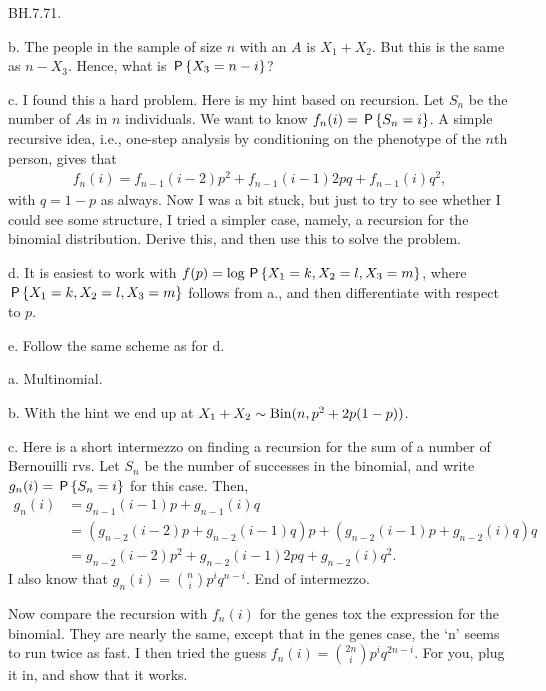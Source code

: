 \begin{exercise}
BH.7.71.

\begin{hint}

b. The people in the sample of size $n$ with an $A$ is $X_1+X_2$. But this is the same as $n-X_3$. Hence, what is $\P{X_3=n-i}$?


c. I found this a hard problem.
Here is my hint based on recursion.
Let $S_n$ be the number of $A$s in $n$ individuals.
We want to know $f_n(i) = \P{S_n=i}$.
A simple recursive idea, i.e., one-step analysis by conditioning on the phenotype of the $n$th person, gives that
\begin{align*}
f_n(i)=f_{n-1}(i-2) p^2 + f_{n-1}(i-1) 2p q + f_{n-1}(i)q^2,
\end{align*}
with $q=1-p$ as always. Now I was a bit stuck, but just to try to see whether I could see some structure, I tried a simpler case, namely, a recursion for the binomial distribution. Derive this, and then use this to solve the problem.


d. It is easiest to work with $f(p) = \log \P{X_1=k, X_2=l, X_3 = m}$, where $\P{X_1=k, X_2=l, X_3 = m}$ follows from a., and then differentiate with respect to $p$.

e. Follow the same scheme as for d.
\end{hint}

\begin{solution}
a. Multinomial.

b. With the hint we end up at $X_1+X_2\sim \Bin{n, p^2+2p(1-p)}$.

c. Here is a short intermezzo on finding a recursion for the sum of a number of Bernouilli rvs.  Let $S_n$ be the number of successes in the binomial, and write $g_n(i) = \P{S_n=i}$ for this case.
Then,
\begin{align*}
g_n(i)&= g_{n-1}(i-1)p +  g_{n-1}(i)q \\
&= (g_{n-2}(i-2)p + g_{n-2}(i-1)q)p + (g_{n-2}(i-1)p+g_{n-2}(i)q)q \\
&= g_{n-2}(i-2)p^2 + g_{n-2}(i-1)2p q + g_{n-2}(i)q^{2}.
\end{align*}
I also know that $g_n(i) = {n \choose i} p^iq^{n-i}$.
End of intermezzo.

Now compare the recursion with $f_n(i)$ for the genes tox the expression for the binomial.
They are nearly the same, except that in the genes case, the `n' seems to run twice as fast.
I then tried the guess $f_n(i) = {2n \choose i} p^i q^{2n-i}$.
For you, plug it in, and show that it works.


\end{solution}
\end{exercise}
